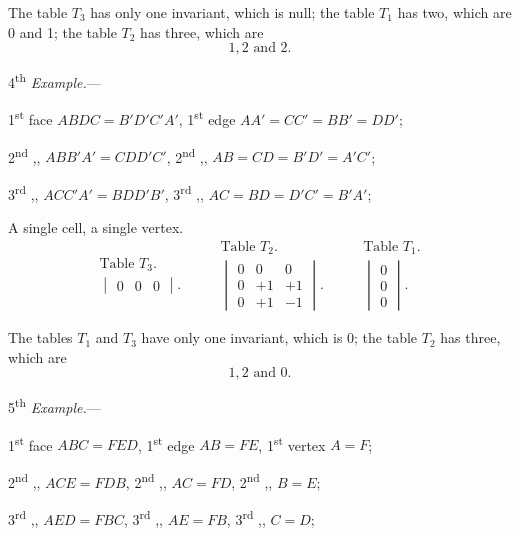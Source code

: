 \documentclass{article}
\begin{document}
The table $T_{3}$ has only one invariant, which is null; the table $T_{1}$ has two, which are 0 and 1; the table $T_{2}$ has three, which are
\[ 1, 2 \text{ and } 2. \]

4\textsuperscript{th} \emph{Example.}---

1\textsuperscript{st} face $ABDC = B'D'C'A'$, 1\textsuperscript{st} edge $AA' = CC' = BB' = DD'$;

2\textsuperscript{nd} ,, $ABB'A' = CDD'C'$, 2\textsuperscript{nd} ,, $AB = CD = B'D' = A'C'$;

3\textsuperscript{rd} ,, $ACC'A' = BDD'B'$, 3\textsuperscript{rd} ,, $AC = BD = D'C' = B'A'$;

A single cell, a single vertex.
\[ \begin{gathered} \text{Table } T_{3}. \\ \begin{vmatrix} 0 & 0 & 0 \end{vmatrix}. \end{gathered} \qquad \begin{gathered} \text{Table } T_{2}. \\ \begin{vmatrix} 0 & 0 & 0 \\[1ex] 0 & +1 & +1 \\[1ex] 0 & +1 & -1 \end{vmatrix}. \end{gathered} \qquad \begin{gathered} \text{Table } T_{1}. \\ \begin{vmatrix} 0 \\[1ex] 0 \\[1ex] 0 \end{vmatrix}. \end{gathered} \]

The tables $T_{1}$ and $T_{3}$ have only one invariant, which is 0; the table $T_{2}$ has three, which are
\[ 1, 2 \text{ and } 0. \]

5\textsuperscript{th} \emph{Example.}---

1\textsuperscript{st} face $ABC = FED$, 1\textsuperscript{st} edge $AB = FE$, 1\textsuperscript{st} vertex $A = F$;

2\textsuperscript{nd} ,, $ACE = FDB$, 2\textsuperscript{nd} ,, $AC = FD$, 2\textsuperscript{nd} ,, $B = E$;

3\textsuperscript{rd} ,, $AED = FBC$, 3\textsuperscript{rd} ,, $AE = FB$, 3\textsuperscript{rd} ,, $C = D$;
\end{document}
